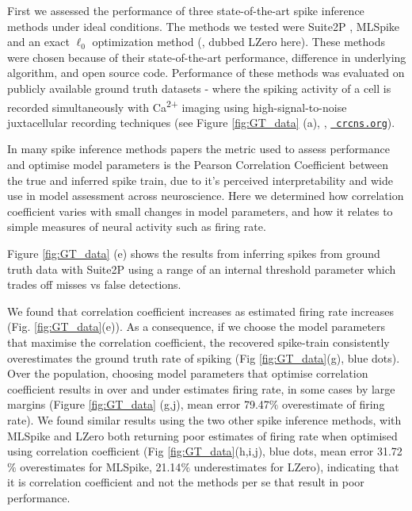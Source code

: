 \documentclass[a4paper,10pt,twocolumn]{article}
\begin{document}
First we assessed the performance of three state-of-the-art spike inference methods under ideal conditions. The methods we tested were Suite2P \citep{Pachitariu_undated-ui},  MLSpike \citep{Deneux2016-gu} and an exact $\ell_{0}$ optimization method (\citet{Jewell2017-pr}, dubbed LZero here). These methods were chosen because of their state-of-the-art performance, difference in underlying algorithm, and open source code. Performance of these methods was evaluated on publicly available ground truth datasets - where the spiking activity of a cell is recorded simultaneously with Ca\textsuperscript{2+} imaging using high-signal-to-noise juxtacellular recording techniques (see Figure \ref{fig:GT_data} (a), \citealp{Chen2013-nv}, \href{https://crcns.org/data-sets/methods/cai-1}{\tt{\color{blue} crcns.org}}). 


In many spike inference methods papers \citep{Brown2004-tj, Paiva2010-qv,Theis2016-ee, Reynolds2017-dr, Berens2018-su} the metric used to assess performance and optimise model parameters is the Pearson Correlation Coefficient between the true and inferred spike train, due to it's perceived interpretability and wide use in model assessment across neuroscience. Here we determined how correlation coefficient varies with small changes in model parameters, and how it relates to simple measures of neural activity such as firing rate.

Figure \ref{fig:GT_data} (e) shows the results from inferring spikes from ground truth data with Suite2P \citep{Pachitariu_undated-ui} using a range of an internal threshold parameter which trades off misses vs false detections. 

We found that correlation coefficient increases as estimated firing rate increases (Fig. \ref{fig:GT_data}(e)). As a consequence, if we choose the model parameters that maximise the correlation coefficient, the recovered spike-train consistently overestimates the ground truth rate of spiking (Fig \ref{fig:GT_data}(g), blue dots). Over the population, choosing model parameters that optimise correlation coefficient results in over and under estimates firing rate, in some cases by large margins (Figure \ref{fig:GT_data} (g,j), mean error 79.47$\%$ overestimate of firing rate). We found similar results using the two other spike inference methods, with MLSpike and LZero both returning poor estimates of firing rate when optimised using correlation coefficient (Fig \ref{fig:GT_data}(h,i,j), blue dots, mean error 31.72$\%$ overestimates for MLSpike, 21.14$\%$ underestimates for LZero), indicating that it is correlation coefficient and not the methods per se that result in poor performance.
\end{document}
